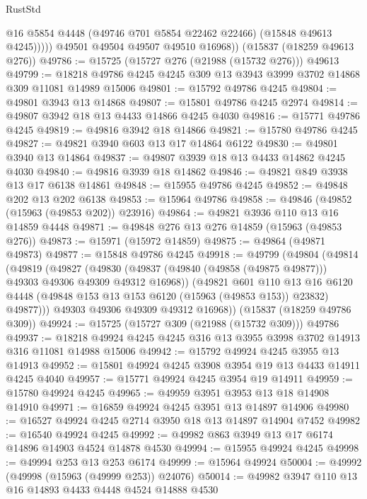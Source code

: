\begin{lexlean}{RustStd}
\begin{coremodule}
                @16
                @5854
                @4448
                (@49746 @701 @5854 @22462 @22466)
                (@15848 @49613 @4245)))))
        @49501
        @49504
        @49507
        @49510
        @16968))
    (@15837 (@18259 @49613 @276))
@49786 := @15725 (@15727 @276 (@21988 (@15732 @276))) @49613
@49799 := @18218 @49786 @4245 @4245 @309 @13 @3943 @3999 @3702 @14868 @309 @11081 @14989 @15006
@49801 := @15792 @49786 @4245
@49804 := @49801 @3943 @13 @14868
@49807 := @15801 @49786 @4245 @2974
@49814 := @49807 @3942 @18 @13 @4433 @14866 @4245 @4030
@49816 := @15771 @49786 @4245
@49819 := @49816 @3942 @18 @14866
@49821 := @15780 @49786 @4245
@49827 := @49821 @3940 @603 @13 @17 @14864 @6122
@49830 := @49801 @3940 @13 @14864
@49837 := @49807 @3939 @18 @13 @4433 @14862 @4245 @4030
@49840 := @49816 @3939 @18 @14862
@49846 := @49821 @849 @3938 @13 @17 @6138 @14861
@49848 := @15955 @49786 @4245
@49852 := @49848 @202 @13 @202 @6138
@49853 := @15964 @49786
@49858 := @49846 (@49852 (@15963 (@49853 @202)) @23916)
@49864 := @49821 @3936 @110 @13 @16 @14859 @4448
@49871 := @49848 @276 @13 @276 @14859 (@15963 (@49853 @276))
@49873 := @15971 (@15972 @14859)
@49875 := @49864 (@49871 @49873)
@49877 := @15848 @49786 @4245
@49918 := @49799
    (@49804
      (@49814
        (@49819
          (@49827
            (@49830 (@49837 (@49840 (@49858 (@49875 @49877))) @49303 @49306 @49309 @49312 @16968))
            (@49821
              @601
              @110
              @13
              @16
              @6120
              @4448
              (@49848 @153 @13 @153 @6120 (@15963 (@49853 @153)) @23832)
              @49877)))
        @49303
        @49306
        @49309
        @49312
        @16968))
    (@15837 (@18259 @49786 @309))
@49924 := @15725 (@15727 @309 (@21988 (@15732 @309))) @49786
@49937 := @18218 @49924 @4245 @4245 @316 @13 @3955 @3998 @3702 @14913 @316 @11081 @14988 @15006
@49942 := @15792 @49924 @4245 @3955 @13 @14913
@49952 := @15801 @49924 @4245 @3908 @3954 @19 @13 @4433 @14911 @4245 @4040
@49957 := @15771 @49924 @4245 @3954 @19 @14911
@49959 := @15780 @49924 @4245
@49965 := @49959 @3951 @3953 @13 @18 @14908 @14910
@49971 := @16859 @49924 @4245 @3951 @13 @14897 @14906
@49980 := @16527 @49924 @4245 @2714 @3950 @18 @13 @14897 @14904 @7452
@49982 := @16540 @49924 @4245
@49992 := @49982 @863 @3949 @13 @17 @6174 @14896 @14903 @4524 @14878 @4530
@49994 := @15955 @49924 @4245
@49998 := @49994 @253 @13 @253 @6174
@49999 := @15964 @49924
@50004 := @49992 (@49998 (@15963 (@49999 @253)) @24076)
@50014 := @49982 @3947 @110 @13 @16 @14893 @4433 @4448 @4524 @14888 @4530

\end{coremodule}
\end{lexlean}
